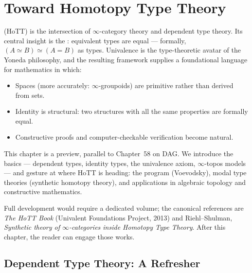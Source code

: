 
\chapter{Toward Homotopy Type Theory}

\begin{overviewbox}
 (HoTT) is the intersection of $\infty$-category
theory and dependent type theory. Its central insight is the
: equivalent types are equal — formally,
$(A \simeq B) \simeq (A = B)$ as types. Univalence is the type-theoretic
avatar of the Yoneda philosophy, and the resulting framework supplies a
foundational language for mathematics in which:
\begin{itemize}
  \item Spaces (more accurately: $\infty$-groupoids) are primitive
        rather than derived from sets.
  \item Identity is structural: two structures with all the same
        properties are formally equal.
  \item Constructive proofs and computer-checkable verification become
        natural.
\end{itemize}

This chapter is a preview, parallel to Chapter~58 on DAG. We introduce
the basics — dependent types, identity types, the univalence axiom,
$\infty$-topos models — and gesture at where HoTT is heading: the
 program (Voevodsky), modal type theories
(synthetic homotopy theory), and applications in algebraic topology and
constructive mathematics.

Full development would require a dedicated volume; the canonical
references are \emph{The HoTT Book} (Univalent Foundations Project,
2013) and Riehl–Shulman, \emph{Synthetic theory of $\infty$-categories
inside Homotopy Type Theory}. After this chapter, the reader can engage
those works.
\end{overviewbox}


\section{Dependent Type Theory: A Refresher}
\label{sec:dtt-refresher}

